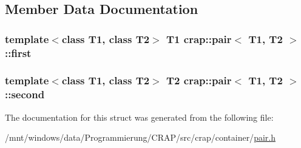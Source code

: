 \subsection{Member Data Documentation}
\hypertarget{structcrap_1_1pair_a1c7b7e7d1bdade135233bb71457c05b3}{
\subsubsection[{first}]{\setlength{\rightskip}{0pt plus 5cm}template$<$class T1, class T2$>$ T1 {\bf crap\-::pair}$<$ T1, T2 $>$\-::first}}\label{structcrap_1_1pair_a1c7b7e7d1bdade135233bb71457c05b3}
\hypertarget{structcrap_1_1pair_ac2b9b46da996e52e23b4ecbd843a79c8}{
\subsubsection[{second}]{\setlength{\rightskip}{0pt plus 5cm}template$<$class T1, class T2$>$ T2 {\bf crap\-::pair}$<$ T1, T2 $>$\-::second}}\label{structcrap_1_1pair_ac2b9b46da996e52e23b4ecbd843a79c8}


The documentation for this struct was generated from the following file\-:\begin{DoxyCompactItemize}
\item 
/mnt/windows/data/\-Programmierung/\-C\-R\-A\-P/src/crap/container/\hyperlink{pair_8h}{pair.\-h}\end{DoxyCompactItemize}
